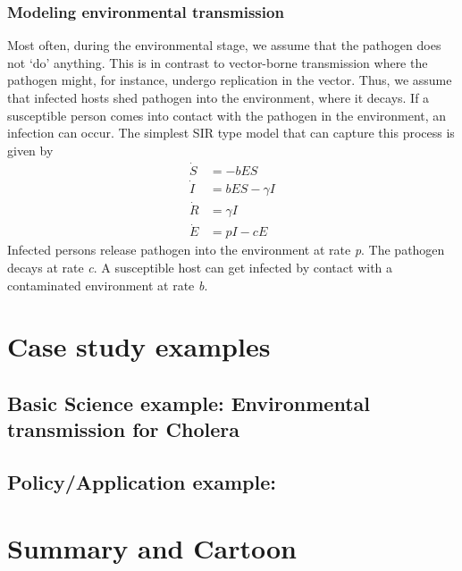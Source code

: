 \documentclass[
]{book}
\begin{document}
\hypertarget{myadvancedbox}{%
\subsubsection{Modeling environmental transmission}\label{myadvancedbox}}

Most often, during the environmental stage, we assume that the pathogen does not `do' anything. This is in contrast to vector-borne transmission where the pathogen might, for instance, undergo replication in the vector. Thus, we assume that infected hosts shed pathogen into the environment, where it decays. If a susceptible person comes into contact with the pathogen in the environment, an infection can occur. The simplest SIR type model that can capture this process is given by
\[ 
\begin{aligned}
\dot S &= - b E S \\
\dot I &= b E S  - \gamma I \\
\dot R &= \gamma I \\
\dot E &= p I - cE
\end{aligned}
\]
Infected persons release pathogen into the environment at rate \emph{p}. The pathogen decays at rate \emph{c}. A susceptible host can get infected by contact with a contaminated environment at rate \emph{b}.

\hypertarget{case-study-examples-1}{%
\section{Case study examples}\label{case-study-examples-1}}

\hypertarget{basic-science-example-environmental-transmission-for-cholera}{%
\subsection{Basic Science example: Environmental transmission for Cholera}\label{basic-science-example-environmental-transmission-for-cholera}}

\hypertarget{policyapplication-example}{%
\subsection{Policy/Application example:}\label{policyapplication-example}}

\hypertarget{summary-and-cartoon-6}{%
\section{Summary and Cartoon}\label{summary-and-cartoon-6}}
\end{document}
